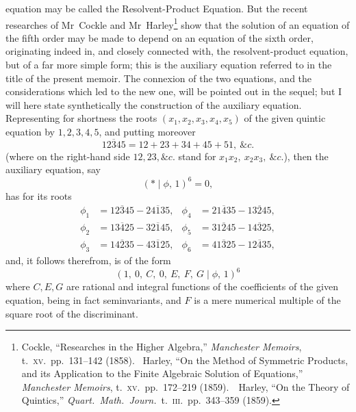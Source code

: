 \documentclass[11pt]{article}
\newcommand{\Cdel}{\mid}
\begin{document}
\noindent equation may be called the Resolvent-Product Equation. But the recent researches of Mr~Cockle and Mr~Harley\footnote{Cockle, ``Researches in the Higher Algebra,'' \textit{Manchester Memoirs}, t.~\textsc{xv}.\ pp.~131--142 (1858). \ Harley, ``On the Method of Symmetric Products, and its Application to the Finite Algebraic Solution of Equations,'' \textit{Manchester Memoirs}, t.~\textsc{xv}.\ pp.~172--219 (1859).\ \ Harley, ``On the Theory of Quintics,'' \textit{Quart.\ Math.\ Journ.}\ t.~\textsc{iii}.\ pp.~343--359 (1859).} show that the solution of an equation of the fifth order may be made to depend on an equation of the sixth order, originating indeed in, and closely connected with, the resolvent-product equation, but of a far more simple form; this is the auxiliary equation referred to in the title of the present memoir. The connexion of the two equations, and the considerations which led to the new one, will be pointed out in the sequel; but I will here state synthetically the construction of the auxiliary equation. Representing for shortness the roots $(x_1, x_2, x_3, x_4, x_5)$ of the given quintic equation by $1, 2, 3, 4, 5$, and putting moreover
\[
   \overline{12345} = 12 + 23 + 34 + 45 + 51,\ \&c.
\]
(where on the right-hand side $12, 23, \&c.$ stand for $x_1 x_2,\ x_2 x_3,\ \&c.$), then the auxiliary equation, say
\[
   (*\Cdel\phi,\,1)^6 = 0,
\]
has for its roots
\[
\begin{aligned}
   \phi_1 &= \overline{12345} - \overline{24135},& \phi_4 &= \overline{21435} - \overline{13245},\\
   \phi_2 &= \overline{13425} - \overline{32145},& \phi_5 &= \overline{31245} - \overline{14325},\\
   \phi_3 &= \overline{14235} - \overline{43125},& \phi_6 &= \overline{41325} - \overline{12435},
\end{aligned}
\]
and, it follows therefrom, is of the form
\[
   (1,\ 0,\ C,\ 0,\ E,\ F,\ G\Cdel\phi,\,1)^6
\]
where $C, E, G$ are rational and integral functions of the coefficients of the given equation, being in fact seminvariants, and $F$ is a mere numerical multiple of the square root of the discriminant.

\medskip
\end{document}
